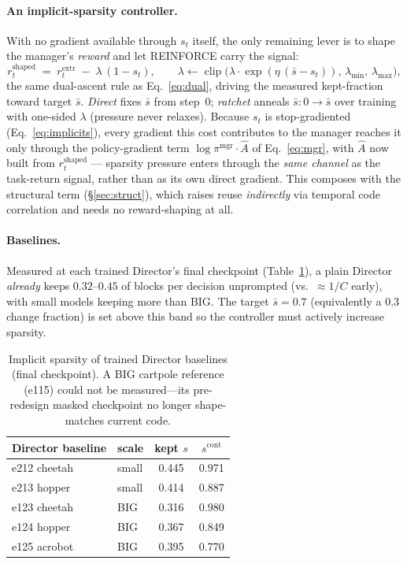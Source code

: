 \documentclass[10pt]{article}
\begin{document}
\paragraph{An implicit-sparsity controller.} With no gradient available
through $s_t$ itself, the only remaining lever is to shape the manager's
\emph{reward} and let REINFORCE carry the signal:
\begin{equation}
r_t^{\text{shaped}} \;=\; r_t^{\text{extr}} \;-\; \lambda\,(1 - s_t), \qquad
\lambda \leftarrow \operatorname{clip}\!\big(\lambda\cdot\exp(\eta\,(\bar s - s_t)),\,
\lambda_{\min},\,\lambda_{\max}\big),
\label{eq:implcost}
\end{equation}
the same dual-ascent rule as Eq.~\eqref{eq:dual}, driving the measured
kept-fraction toward target $\bar s$. \emph{Direct} fixes $\bar s$ from
step~0; \emph{ratchet} anneals $\bar s: 0\to\bar s$ over training with
one-sided $\lambda$ (pressure never relaxes). Because $s_t$ is stop-gradiented
(Eq.~\eqref{eq:implicits}), every gradient this cost contributes to the
manager reaches it only through the policy-gradient term
$\log\pi^{\text{mgr}}\!\cdot\hat A$ of Eq.~\eqref{eq:mgr}, with $\hat A$ now
built from $r_t^{\text{shaped}}$ --- sparsity pressure enters through the
\emph{same channel} as the task-return signal, rather than as its own direct
gradient. This composes with the structural term (\S\ref{sec:struct}), which
raises reuse \emph{indirectly} via temporal code correlation and needs no
reward-shaping at all.

\paragraph{Baselines.} Measured at each trained Director's final checkpoint
(Table~\ref{tab:implbaseline}), a plain Director \emph{already} keeps
$0.32$--$0.45$ of blocks per decision unprompted (vs.\ $\approx\!1/C$ early),
with small models keeping more than BIG. The target $\bar s=0.7$
(equivalently a $0.3$ change fraction) is set above this band so the controller
must actively increase sparsity.

\begin{table}[h]
\centering\small
\begin{tabular}{llcc}
\toprule
Director baseline & scale & kept $s$ & $s^{\mathrm{cont}}$ \\
\midrule
e212 cheetah & small & 0.445 & 0.971 \\
e213 hopper  & small & 0.414 & 0.887 \\
e123 cheetah & BIG   & 0.316 & 0.980 \\
e124 hopper  & BIG   & 0.367 & 0.849 \\
e125 acrobot & BIG   & 0.395 & 0.770 \\
\bottomrule
\end{tabular}
\caption{Implicit sparsity of trained Director baselines (final checkpoint). A
BIG cartpole reference (e115) could not be measured---its pre-redesign masked
checkpoint no longer shape-matches current code.}
\label{tab:implbaseline}
\end{table}
\end{document}
